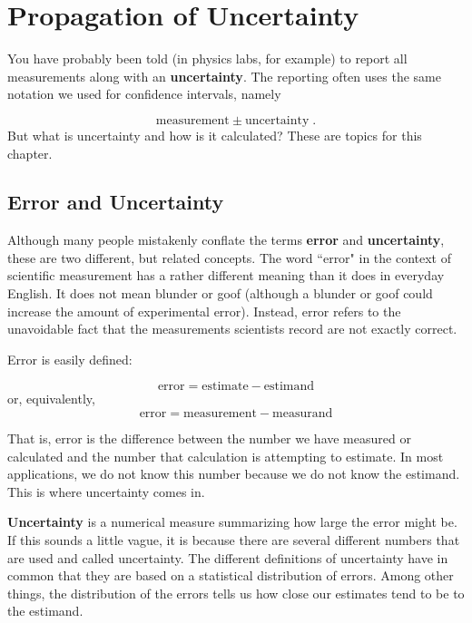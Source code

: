 \documentclass[twoside]{book}\usepackage[]{graphicx}\usepackage[]{xcolor}
\def\myindex#1{\index{#1}}
\def\term#1{\textbf{#1}}
\newlength{\tempfmlength}
\newenvironment{fmpage}[1]
     {
	 \medskip
	 \setlength{\tempfmlength}{#1}
	 \begin{lrbox}{\fmbox}
	   \begin{minipage}{#1}
		 \vspace*{.02\tempfmlength}
		 \hfill
	   \begin{minipage}{.95 \tempfmlength}}
		 {\end{minipage}\hfill
		 \vspace*{.015\tempfmlength}
		 \end{minipage}\end{lrbox}\fbox{\usebox{\fmbox}}
	 \medskip
	 }
\newenvironment{boxedText}[1][.98\textwidth]%
{%
\begin{center}
\begin{fmpage}{#1}
}%
{%
\end{fmpage}
\end{center}
}
\newcounter{example}[section]
\newif\ifsolutions
\newif\ifsolutionslocal
\begin{document}
\shipoutProblems

\ifsolutions
\ifsolutionslocal
\newpage
\section*{Solutions}
\shipoutSolutions
\fi
\fi


\setcounter{chapter}{5}

\chapter{Propagation of Uncertainty}
\label{chap:propagation}%

\myindex{uncertainty|defidx}
You have probably been told (in physics labs, for example) to report all measurements
along with an \term{uncertainty}.  The reporting often uses the same notation we used
for confidence intervals, namely

\[ \mbox{measurement} \pm \mbox{uncertainty} \;. \]
%
But what is uncertainty and how is it calculated?  These are topics for this chapter.

\section{Error and Uncertainty}
Although many people mistakenly conflate the terms \term{error} and \term{uncertainty}, 
these are two different, but related concepts.  
The word ``error" in the context of scientific measurement has a rather
different meaning than it does in everyday English. It does not mean blunder or
goof (although a blunder or goof could increase the amount of experimental error). 
Instead, error refers to the unavoidable fact that
the measurements scientists record are not exactly correct.


Error is easily defined:

\begin{boxedText}
	\[ \mbox{error} = \mbox{estimate} - \mbox{estimand} \]
or, equivalently,
	\[ \mbox{error} = \mbox{measurement} - \mbox{measurand} \]
\end{boxedText}
That is, error is the difference between the number we have measured or calculated and the 
number that calculation is attempting to estimate.  In most applications, we do not know 
this number because we do not know the estimand.  This is where uncertainty comes in.

\term{Uncertainty} is a numerical measure summarizing how large the error might be.  If this
sounds a little vague, it is because there are several different numbers that are used and called 
uncertainty.  The different definitions of uncertainty have in common that they are based
on a statistical distribution of errors.  
Among other things, the distribution
of the errors tells us how close our estimates tend to be to the estimand.
\end{document}
